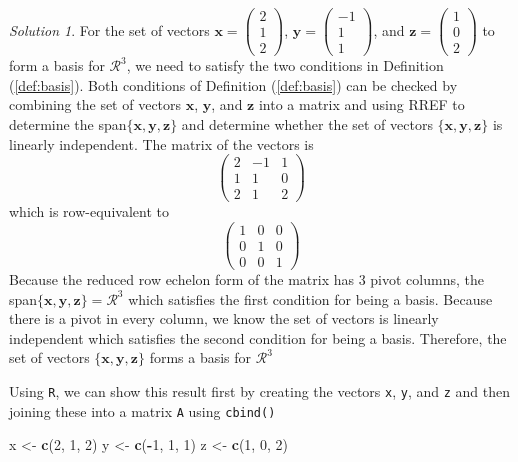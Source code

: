 \documentclass[
]{book}
\newenvironment{Shaded}{\begin{snugshade}}{\end{snugshade}}
\newcommand{\DecValTok}[1]{\textcolor[rgb]{0.00,0.00,0.81}{#1}}
\newcommand{\KeywordTok}[1]{\textcolor[rgb]{0.13,0.29,0.53}{\textbf{#1}}}
\newcommand{\NormalTok}[1]{#1}
\newcommand{\OperatorTok}[1]{\textcolor[rgb]{0.81,0.36,0.00}{\textbf{#1}}}
\newcommand{\StringTok}[1]{\textcolor[rgb]{0.31,0.60,0.02}{#1}}
\theoremstyle{definition}
\theoremstyle{definition}
\theoremstyle{definition}
\theoremstyle{definition}
\theoremstyle{remark}
\newtheorem*{solution}{Solution}
\begin{document}
\begin{solution}
For the set of vectors \(\mathbf{x} = \begin{pmatrix} 2 \\ 1 \\ 2 \end{pmatrix}\), \(\mathbf{y} = \begin{pmatrix} -1 \\ 1 \\ 1 \end{pmatrix}\), and \(\mathbf{z} = \begin{pmatrix} 1 \\ 0 \\ 2 \end{pmatrix}\) to form a basis for \(\mathcal{R}^3\), we need to satisfy the two conditions in Definition (\ref{def:basis}). Both conditions of Definition (\ref{def:basis}) can be checked by combining the set of vectors \(\mathbf{x}\), \(\mathbf{y}\), and \(\mathbf{z}\) into a matrix and using RREF to determine the span\(\{ \mathbf{x}, \mathbf{y}, \mathbf{z} \}\) and determine whether the set of vectors \(\{ \mathbf{x}, \mathbf{y}, \mathbf{z} \}\) is linearly independent. The matrix of the vectors is
\[
\begin{pmatrix} 2 & -1 & 1 \\ 1 & 1 & 0 \\ 2 & 1 & 2 \end{pmatrix}
\]
which is row-equivalent to
\[
\begin{pmatrix} 1 & 0 & 0 \\ 0 & 1 & 0 \\ 0 & 0 & 1 \end{pmatrix}
\]
Because the reduced row echelon form of the matrix has 3 pivot columns, the span\(\{ \mathbf{x}, \mathbf{y}, \mathbf{z} \} = \mathcal{R}^3\) which satisfies the first condition for being a basis. Because there is a pivot in every column, we know the set of vectors is linearly independent which satisfies the second condition for being a basis. Therefore, the set of vectors \(\{ \mathbf{x}, \mathbf{y}, \mathbf{z} \}\) forms a basis for \(\mathcal{R}^3\)

Using \texttt{R}, we can show this result first by creating the vectors \texttt{x}, \texttt{y}, and \texttt{z} and then joining these into a matrix \texttt{A} using \texttt{cbind()}

\begin{Shaded}
\begin{Highlighting}[]
\NormalTok{x <-}\StringTok{ }\KeywordTok{c}\NormalTok{(}\DecValTok{2}\NormalTok{, }\DecValTok{1}\NormalTok{, }\DecValTok{2}\NormalTok{)}
\NormalTok{y <-}\StringTok{ }\KeywordTok{c}\NormalTok{(}\OperatorTok{-}\DecValTok{1}\NormalTok{, }\DecValTok{1}\NormalTok{, }\DecValTok{1}\NormalTok{)}
\NormalTok{z <-}\StringTok{ }\KeywordTok{c}\NormalTok{(}\DecValTok{1}\NormalTok{, }\DecValTok{0}\NormalTok{, }\DecValTok{2}\NormalTok{)}


\end{Highlighting}
\end{Shaded}
\end{solution}
\end{document}
